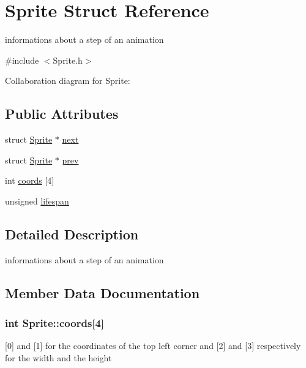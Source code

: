 \hypertarget{structSprite}{}\section{Sprite Struct Reference}
\label{structSprite}


informations about a step of an animation  




{\ttfamily \#include $<$Sprite.\+h$>$}



Collaboration diagram for Sprite\+:
\subsection*{Public Attributes}
\begin{DoxyCompactItemize}
\item 
struct \hyperlink{structSprite}{Sprite} $\ast$ \hyperlink{structSprite_a52b8df63621811a2835cd11ba69cebfb}{next}
\item 
struct \hyperlink{structSprite}{Sprite} $\ast$ \hyperlink{structSprite_a2c09859f5f18f9d8272171eb43bf66e8}{prev}
\item 
int \hyperlink{structSprite_a63a82c9db293f2a0b9a043894cea93ce}{coords} \mbox{[}4\mbox{]}
\item 
unsigned \hyperlink{structSprite_ac7deb2af6710a22bec013f2214fc0df7}{lifespan}
\end{DoxyCompactItemize}


\subsection{Detailed Description}
informations about a step of an animation 

\subsection{Member Data Documentation}
\subsubsection[{\texorpdfstring{coords}{coords}}]{\setlength{\rightskip}{0pt plus 5cm}int Sprite\+::coords\mbox{[}4\mbox{]}}\hypertarget{structSprite_a63a82c9db293f2a0b9a043894cea93ce}{}\label{structSprite_a63a82c9db293f2a0b9a043894cea93ce}
\mbox{[}0\mbox{]} and \mbox{[}1\mbox{]} for the coordinates of the top left corner and \mbox{[}2\mbox{]} and \mbox{[}3\mbox{]} respectively for the width and the height 
